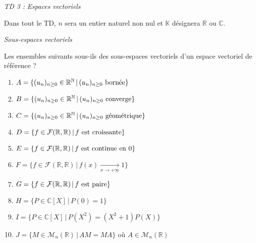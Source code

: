 \documentclass[a4paper,10pt]{report}
\begin{document}
\everymath{\displaystyle}

\everymath{\displaystyle}
\begin{center}
\textit{{ {\huge TD 3 : Espaces vectoriels}}}
\end{center}
\bigskip


\noindent Dans tout le TD, $n$ sera un entier naturel non nul et $\mathbb{K}$ désignera $\mathbb{R}$ ou $\mathbb{C}$.

\medskip

\begin{center}
\textit{{ {\large Sous-espaces vectoriels}}}
\end{center}

\begin{Exa} Les ensembles suivants sous-ils des sous-espaces vectoriels d'un espace vectoriel de référence ?

\begin{multicols}{2}
\begin{small}
\begin{enumerate}
\item $A = \lbrace (u_n)_{n \geq 0} \in \mathbb{R}^{\mathbb{N}} \, \vert \, (u_n)_{n \geq 0} \hbox{ bornée} \rbrace $
\item $B = \lbrace (u_n)_{n \geq 0} \in \mathbb{R}^{\mathbb{N}} \, \vert \, (u_n)_{n \geq 0} \hbox{ converge} \rbrace $
\item $C = \lbrace (u_n)_{n \geq 0} \in \mathbb{R}^{\mathbb{N}} \, \vert \, (u_n)_{n \geq 0} \hbox{ géométrique} \rbrace $
\item $D = \lbrace f \in \mathcal{F}(\mathbb{R}, \mathbb{R}) \, \vert \, f \hbox{ est croissante} \rbrace$
\item $E = \lbrace f \in \mathcal{F}(\mathbb{R}, \mathbb{R}) \, \vert \, f \hbox{ est continue en 0} \rbrace$
\columnbreak
\item $F = \lbrace f \in \mathcal{F}(\mathbb{R}, \mathbb{R}) \, \vert \, f(x) \underset{ x \rightarrow + \infty}{\rightarrow} 1 \rbrace$
\item $G= \lbrace f \in \mathcal{F}(\mathbb{R}, \mathbb{R}) \, \vert \, f \hbox{ est paire} \rbrace$
\item $H= \lbrace P \in \mathbb{C}[X] \, \vert \, P(0)=1  \rbrace$
\item $I= \lbrace P \in \mathbb{C}[X] \, \vert \, P(X^2)=(X^2+1)P(X)  \rbrace$
\item $J= \lbrace M \in \mathcal{M}_n(\mathbb{R}) \, \vert \, AM=MA \rbrace$ où $A \in \mathcal{M}_n(\mathbb{R})$
\end{enumerate}
\end{small}
\end{multicols}
\vspace{0.01cm}
\end{Exa}
\end{document}
